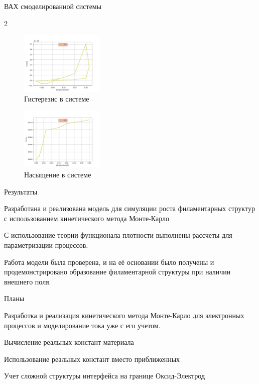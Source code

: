\documentclass{beamer}%
\begin{document}
\begin{frame}{ВАХ смоделированной системы}
    \begin {multicols}{2}
        \begin{figure}
            \centering
            \includegraphics[width=150px]{img/result-vac.png}
            \caption {Гистерезис в системе}
        \end{figure}
        \columnbreak
        \begin{figure}
            \centering
            \includegraphics[width=150px]{img/result-nas.png}
            \caption {Насыщение в системе}
        \end{figure}   
    \end{multicols}

\end{frame}

\begin{frame}{Результаты}

\begin{list}{*}{}
    \item  Разработана и реализована модель для симуляции роста филаментарных структур с использованием кинетического метода Монте-Карло
    \item  С использование теории функционала плотности выполнены рассчеты для параметризации процессов.
    \item  Работа модели была проверена, и на её основании было получены и продемонстрировано образование филаментарной структуры при наличии внешнего поля.
\end{list}
\end{frame}
\begin{frame}{Планы}

\begin{list}{*}{}
    \item  Разработка и реализация кинетического метода Монте-Карло для электронных процессов и моделирование тока уже с его учетом.
    \item  Вычисление реальных констант материала
    \item  Использование реальных констант вместо приближенных
    \item  Учет сложной структуры интерфейса на границе Оксид-Электрод
\end{list}



\end{frame}
\end{document}
